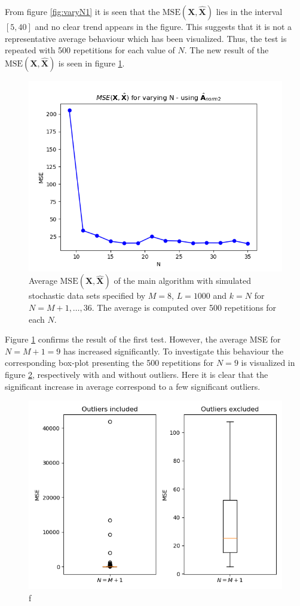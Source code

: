 \noindent
From figure \ref{fig:varyN1} it is seen that the $\text{MSE}(\mathbf{X}, \hat{\mathbf{X}})$ lies in the interval $[5,40]$ and no clear trend appears in the figure. 
This suggests that it is not a representative average behaviour which has been visualized. 
Thus, the test is repeated with 500 repetitions for each value of $N$. 
The new result of the $\text{MSE}(\mathbf{X}, \hat{\mathbf{X}})$ is seen in figure \ref{fig:varyN2}.
\begin{figure}[H]
    \centering
	\includegraphics[scale=0.5]{figures/ch_6/varyN2.png}
	\caption{Average $\text{MSE}(\mathbf{X}, \hat{\mathbf{X}})$ of the main algorithm with simulated stochastic data sets specified by $M = 8$, $L = 1000$ and $k = N$ for $N = M+1, \dots ,36$. The average is computed over 500 repetitions for each $N$.}
	\label{fig:varyN2}
\end{figure}  
\noindent
Figure \ref{fig:varyN2} confirms the result of the first test. 
However, the average MSE for $N = M + 1 = 9$ has increased significantly. 
To investigate this behaviour the corresponding box-plot presenting the 500 repetitions for $N=9$ is visualized in figure \ref{fig:box}, respectively with and without outliers. 
Here it is clear that the significant increase in average correspond to a few significant outliers. 
\begin{figure}[H]
    \centering
	\includegraphics[scale=0.5]{figures/ch_6/boxplot.png}
	\caption{f}
	\label{fig:box}
\end{figure}
